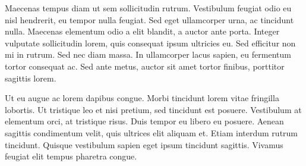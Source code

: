 \documentclass[12pt]{article}
\begin{document}
Maecenas tempus diam ut sem sollicitudin rutrum. Vestibulum feugiat odio eu nisl hendrerit, eu tempor nulla feugiat. Sed eget ullamcorper urna, ac tincidunt nulla. Maecenas elementum odio a elit blandit, a auctor ante porta. Integer vulputate sollicitudin lorem, quis consequat ipsum ultricies eu. Sed efficitur non mi in rutrum. Sed nec diam massa. In ullamcorper lacus sapien, eu fermentum tortor consequat ac. Sed ante metus, auctor sit amet tortor finibus, porttitor sagittis lorem.

Ut eu augue ac lorem dapibus congue. Morbi tincidunt lorem vitae fringilla lobortis. Ut tristique leo et nisi pretium, sed tincidunt est posuere. Vestibulum at elementum orci, at tristique risus. Duis tempor eu libero eu posuere. Aenean sagittis condimentum velit, quis ultrices elit aliquam et. Etiam interdum rutrum tincidunt. Quisque vestibulum sapien eget ipsum tincidunt sagittis. Vivamus feugiat elit tempus pharetra congue. 
\end{document}
